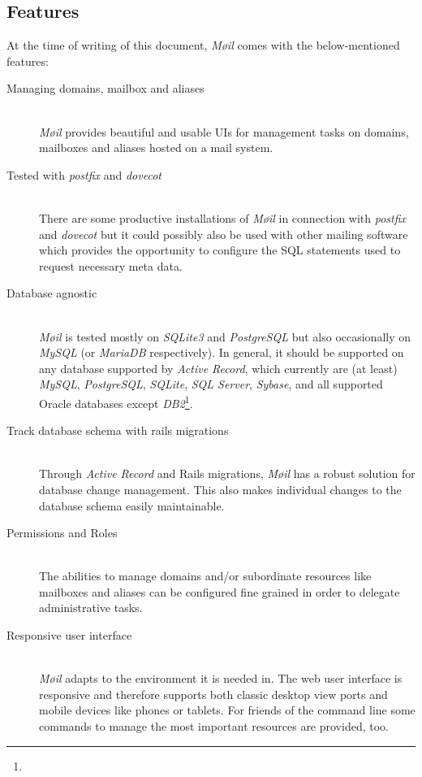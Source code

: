 \documentclass[12pt,a4paper]{scrartcl}
\begin{document}
		\subsection{Features}
		\label{sec:moeil:features}
			At the time of writing of this document, \emph{Møil} comes with the
			below-mentioned features:

			\begin{description}
				\item[\rm Managing domains, mailbox and aliases]\ \\
					\emph{Møil} provides beautiful and usable \acp{UI} for
					management tasks on domains, mailboxes and aliases hosted
					on a mail system.

				\item[\rm Tested with \emph{postfix} and \emph{dovecot}]\ \\
					There are some productive installations of \emph{Møil} in
					connection with \emph{postfix} and \emph{dovecot} but it
					could possibly also be used with other mailing software
					which provides the opportunity to configure the \ac{SQL}
					statements used to request necessary meta data.
				
				\item[\rm Database agnostic]\ \\
					\emph{Møil} is tested mostly on \emph{SQLite3} and
					\emph{PostgreSQL} but also occasionally on \emph{MySQL} (or
					\emph{MariaDB} respectively). In general, it should be
					supported on any database supported by \emph{Active
					Record}, which currently are (at least) \emph{MySQL},
					\emph{PostgreSQL}, \emph{SQLite}, \emph{SQL Server},
					\emph{Sybase}, and all supported Oracle databases except
					\emph{DB2}\footnote{\urlARSupport}.

				\item[\rm Track database schema with rails migrations]\ \\
					Through \emph{Active Record} and \ac{Rails} migrations,
					\emph{Møil} has a robust solution for database change
					management. This also makes individual changes to the
					database schema easily maintainable.

				\item[\rm Permissions and Roles]\ \\
					The abilities to manage domains and/or subordinate
					resources like mailboxes and aliases can be configured fine
					grained in order to delegate administrative tasks.

				\item[\rm Responsive user interface]\ \\
					\emph{Møil} adapts to the environment it is needed in. The
					web user interface is responsive and therefore supports
					both classic desktop view ports and mobile devices like
					phones or tablets. For friends of the command line some
					commands to manage the most important resources are
					provided, too.


\end{description}
\end{document}
